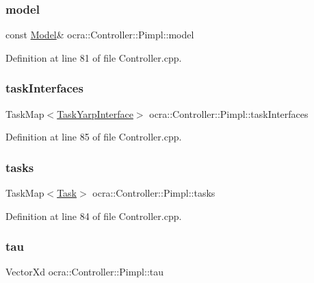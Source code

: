 \subsubsection{\texorpdfstring{model}{model}}
{\footnotesize\ttfamily const \hyperlink{classocra_1_1Model}{Model}\& ocra\+::\+Controller\+::\+Pimpl\+::model}



Definition at line 81 of file Controller.\+cpp.

\hypertarget{structocra_1_1Controller_1_1Pimpl_a396836991948d8d90cf5852330d2c5c3}{}\label{structocra_1_1Controller_1_1Pimpl_a396836991948d8d90cf5852330d2c5c3} 
\subsubsection{\texorpdfstring{task\+Interfaces}{taskInterfaces}}
{\footnotesize\ttfamily Task\+Map$<$\hyperlink{classocra_1_1TaskYarpInterface}{Task\+Yarp\+Interface}$>$ ocra\+::\+Controller\+::\+Pimpl\+::task\+Interfaces}



Definition at line 85 of file Controller.\+cpp.

\hypertarget{structocra_1_1Controller_1_1Pimpl_a246fa1cc15ad20293ef78b04dc0dbe70}{}\label{structocra_1_1Controller_1_1Pimpl_a246fa1cc15ad20293ef78b04dc0dbe70} 
\subsubsection{\texorpdfstring{tasks}{tasks}}
{\footnotesize\ttfamily Task\+Map$<$\hyperlink{classocra_1_1Task}{Task}$>$ ocra\+::\+Controller\+::\+Pimpl\+::tasks}



Definition at line 84 of file Controller.\+cpp.

\hypertarget{structocra_1_1Controller_1_1Pimpl_a06e7fceb4a0a3c678a4e26fc12946e5c}{}\label{structocra_1_1Controller_1_1Pimpl_a06e7fceb4a0a3c678a4e26fc12946e5c} 
\subsubsection{\texorpdfstring{tau}{tau}}
{\footnotesize\ttfamily Vector\+Xd ocra\+::\+Controller\+::\+Pimpl\+::tau}



